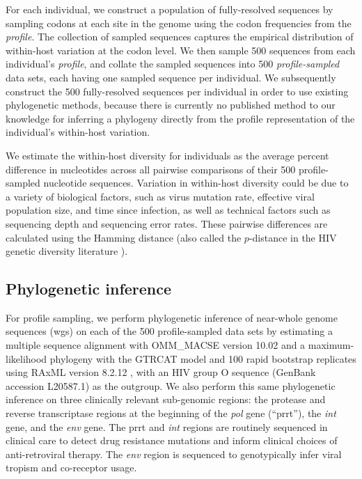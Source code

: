 \documentclass[letterpaper]{article}
\begin{document}
For each individual, we construct a population of fully-resolved sequences by sampling codons at each site in the genome using the codon frequencies from the \emph{profile}. The collection of sampled sequences captures the empirical distribution of within-host variation at the codon level. We then sample 500 sequences from each individual's \emph{profile}, and collate the sampled sequences into 500 \emph{profile-sampled} data sets, each having one sampled sequence per individual. We subsequently construct the 500 fully-resolved sequences per individual in order to use existing phylogenetic methods, because there is currently no published method to our knowledge for inferring a phylogeny directly from the profile representation of the individual's within-host variation.

We estimate the within-host diversity for individuals as the average percent difference in nucleotides across all pairwise comparisons of their 500 profile-sampled nucleotide sequences. Variation in within-host diversity could be due to a variety of biological factors, such as virus mutation rate, effective viral population size, and time since infection, as well as technical factors such as sequencing depth and sequencing error rates. These pairwise differences are calculated using the Hamming distance \parencite{allam} (also called the $p$-distance in the HIV genetic diversity literature \parencite{maldarelli, hassan}).

\subsection*{Phylogenetic inference}

For profile sampling, we perform phylogenetic inference of near-whole genome sequences (wgs) on each of the 500 profile-sampled data sets by estimating a multiple sequence alignment with OMM\_MACSE version 10.02 \parencite{ranwez} and a maximum-likelihood phylogeny with the GTRCAT model and 100 rapid bootstrap replicates using RAxML version 8.2.12 \parencite{stamatakis}, with an HIV group O sequence (GenBank accession L20587.1) as the outgroup. We also perform this same phylogenetic inference on three clinically relevant sub-genomic regions: the protease and reverse transcriptase regions at the beginning of the \emph{pol} gene (``prrt''), the \emph{int} gene, and the \emph{env} gene. The prrt and \emph{int} regions are routinely sequenced in clinical care to detect drug resistance mutations and inform clinical choices of anti-retroviral therapy. The \emph{env} region is sequenced to genotypically infer viral tropism and co-receptor usage.
\end{document}

